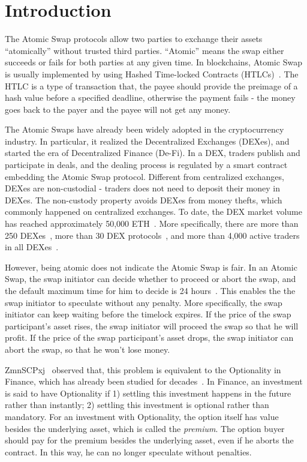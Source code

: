 \section{Introduction}
\label{sec:intro}

The Atomic Swap protocols allow two parties to exchange their assets ``atomically'' without trusted third parties.
``Atomic'' means the swap either succeeds or fails for both parties at any given time.
In blockchains, Atomic Swap is usually implemented by using Hashed Time-locked Contracts (HTLCs)~\cite{poon2016bitcoin}.
The HTLC is a type of transaction that, the payee should provide the preimage of a hash value before a specified deadline, otherwise the payment fails - the money goes back to the payer and the payee will not get any money.

The Atomic Swaps have already been widely adopted in the cryptocurrency industry.
In particular, it realized the Decentralized Exchanges (DEXes), and started the era of Decentralized Finance (De-Fi).
In a DEX, traders publish and participate in deals, and the dealing process is regulated by a smart contract embedding the Atomic Swap protocol.
Different from centralized exchanges, DEXes are non-custodial - traders does not need to deposit their money in DEXes.
The non-custody property avoids DEXes from money thefts, which commonly happened on centralized exchanges.
To date, the DEX market volume has reached approximately 50,000 ETH~\cite{dexwatch}.
More specifically,
there are more than 250 DEXes~\cite{distribuyed/index},
more than 30 DEX protocols~\cite{evbots/dex-protocols},
and more than 4,000 active traders in all DEXes~\cite{dexwatch}.



However, being atomic does not indicate the Atomic Swap is fair.
In an Atomic Swap, the swap initiator can decide whether to proceed or abort the swap, and the default maximum time for him to decide is 24 hours~\cite{nolan2013alt}.
This enables the the swap initiator to speculate without any penalty.
More specifically, the swap initiator can keep waiting before the timelock expires.
If the price of the swap participant's asset rises, the swap initiator will proceed the swap so that he will profit.
If the price of the swap participant's asset drops, the swap initiator can abort the swap, so that he won't lose money.

ZmnSCPxj~\cite{optionality-origin} observed that, this problem is equivalent to the Optionality in Finance, which has already been studied for decades~\cite{higham2004introduction}.
In Finance, an investment is said to have Optionality if
1) settling this investment happens in the future rather than instantly;
2) settling this investment is optional rather than mandatory.
For an investment with Optionality, the option itself has value besides the underlying asset, which is called the \textit{premium}.
The option buyer should pay for the premium besides the underlying asset, even if he aborts the contract.
In this way, he can no longer speculate without penalties.

